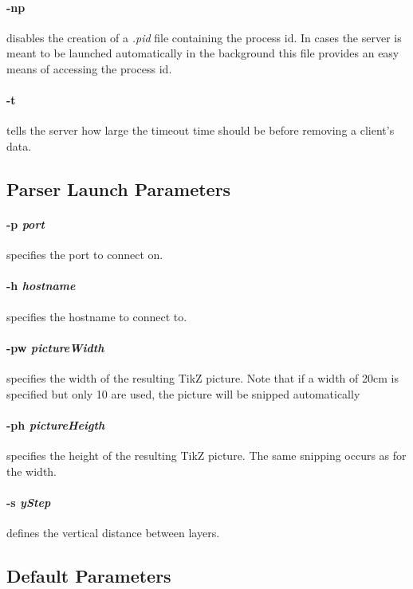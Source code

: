 \paragraph{-np} disables the creation of a \textit{.pid} file containing the process id.
In cases the server is meant to be launched automatically in the background this file provides an easy means of accessing the process id.

\paragraph{-t} tells the server how large the timeout time should be before removing a client's data.

\subsection*{Parser Launch Parameters}
\paragraph{-p \textit{port}} specifies the port to connect on.

\paragraph{-h \textit{hostname}} specifies the hostname to connect to.

\paragraph{-pw \textit{pictureWidth}} specifies the width of the resulting TikZ picture.
Note that if a width of 20cm is specified but only 10 are used, the picture will be snipped automatically

\paragraph{-ph \textit{pictureHeigth}} specifies the height of the resulting TikZ picture.
The same snipping occurs as for the width.

\paragraph{-s \textit{yStep}} defines the vertical distance between layers.

\subsection*{Default Parameters}
